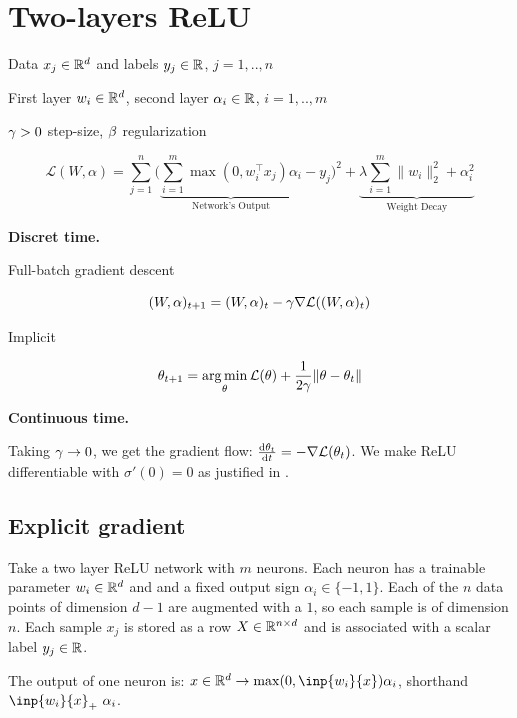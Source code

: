 \section{Two-layers ReLU}

Data $x_j \in \mathbb{R}^d$ and labels $y_j \in \mathbb{R}$, $j=1,..,n$

First layer $w_i \in \mathbb{R}^d$, second layer $\alpha_i \in \mathbb{R}$, $i=1,..,m$

$\gamma>0$ step-size, $\beta$ regularization

\begin{equation}
	 \mathcal{L}(W, \alpha) = \sum_{j=1}^n \bigg( \underbrace{\sum_{i=1}^m \max(0, w_i^\top x_j) \alpha_i}_{\text{Network's Output}} - y_j \bigg)^2 + \underbrace{\lambda \sum_{i=1}^m \| w_i \|^2_2 + \alpha_i^2}_{\text{Weight Decay}}
\end{equation}


\textbf{Discret time.}

Full-batch gradient descent

\begin{equation}
	(W, \alpha)_{t+1} = (W, \alpha)_t - \gamma \nabla \mathcal{L}((W, \alpha)_t)
\end{equation}

Implicit

\begin{equation}
	\theta_{t+1} = \operatorname*{arg\,min}_{\theta} \mathcal{L}(\theta) +\frac{1}{2\gamma} \lVert\theta - \theta_t\rVert
\end{equation}

\textbf{Continuous time.}

Taking $\gamma \to 0$, we get the gradient flow: $\frac{\mathrm{d} \theta_t}{\mathrm{d} t} = - \nabla \mathcal{L}(\theta_t)$. We make ReLU differentiable with $\sigma'(0)=0$ as justified in \citep{boursierGradientFlowDynamics2022}.

\subsection{Explicit gradient}

Take a two layer ReLU network with $m$ neurons. Each neuron has a trainable parameter $w_i \in \mathbb{R}^d$ and and a fixed output sign $\alpha_i \in \{-1, 1\}$. Each of the $n$ data points of dimension $d-1$ are augmented with a $1$, so each sample is of dimension $n$. Each sample $x_j$ is stored as a row $X \in \mathbb{R}^{n \times d}$  and is associated with a scalar label $y_j \in \mathbb{R}$.

The output of one neuron is: $x \in \R^d \rightarrow \max(0, \inp{w_i}{x}) \alpha_i$, shorthand $\inp{w_i}{x}_+ ~ \alpha_i$.

